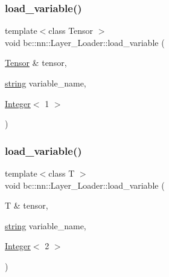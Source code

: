 \subsubsection{\texorpdfstring{load\+\_\+variable()}{load\_variable()}\hspace{0.1cm}{\footnotesize\ttfamily [2/4]}}
{\footnotesize\ttfamily template$<$class Tensor $>$ \\
void bc\+::nn\+::\+Layer\+\_\+\+Loader\+::load\+\_\+variable (\begin{DoxyParamCaption}\item[{\hyperlink{namespacebc_a659391e47ab612be3ba6c18cf9c89159}{Tensor} \&}]{tensor,  }\item[{\hyperlink{structbc_1_1string}{string}}]{variable\+\_\+name,  }\item[{\hyperlink{structbc_1_1traits_1_1Integer}{Integer}$<$ 1 $>$}]{ }\end{DoxyParamCaption})\hspace{0.3cm}{\ttfamily [inline]}}

\mbox{\label{structbc_1_1nn_1_1Layer__Loader_ac1785de99dd005ba3c5ecc53ec35bb14}} 
\subsubsection{\texorpdfstring{load\+\_\+variable()}{load\_variable()}\hspace{0.1cm}{\footnotesize\ttfamily [3/4]}}
{\footnotesize\ttfamily template$<$class T $>$ \\
void bc\+::nn\+::\+Layer\+\_\+\+Loader\+::load\+\_\+variable (\begin{DoxyParamCaption}\item[{T \&}]{tensor,  }\item[{\hyperlink{structbc_1_1string}{string}}]{variable\+\_\+name,  }\item[{\hyperlink{structbc_1_1traits_1_1Integer}{Integer}$<$ 2 $>$}]{ }\end{DoxyParamCaption})\hspace{0.3cm}{\ttfamily [inline]}}

\mbox{\label{structbc_1_1nn_1_1Layer__Loader_a1f23f8e38f957267f2169281e79b4103}} 
